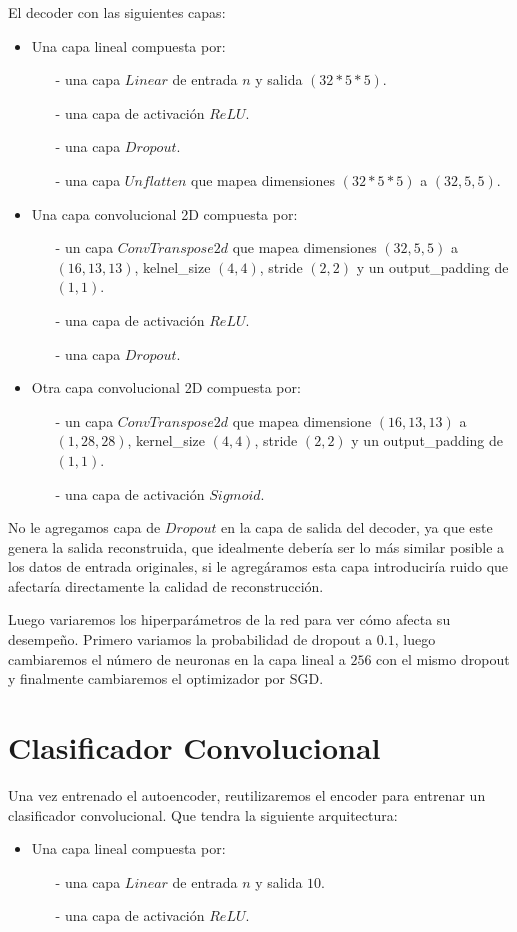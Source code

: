 \documentclass[aps,prl,reprint,groupedaddress]{revtex4-2}
\begin{document}
El decoder con las siguientes capas:
\begin{itemize}
  \item Una capa lineal compuesta por:
  \begin{itemize}
    \item [-] una capa $Linear$ de entrada $n$ y salida $(32*5*5)$.
    \item [-] una capa de activación $ReLU$.
    \item [-] una capa $Dropout$.
    \item [-] una capa $Unflatten$ que mapea dimensiones $(32*5*5)$ a $(32, 5, 5)$.
  \end{itemize}
  \item Una capa convolucional 2D compuesta por:
  \begin{itemize}
    \item [-] un capa $ConvTranspose2d$ que mapea dimensiones $(32, 5, 5)$ a
    $(16, 13, 13)$, kelnel\_size $(4,4)$, stride $(2,2)$ y un 
    output\_padding de $(1,1)$.
    \item [-] una capa de activación $ReLU$.
    \item [-] una capa $Dropout$.
  \end{itemize}
  \item Otra capa convolucional 2D compuesta por:
  \begin{itemize}
    \item [-] un capa $ConvTranspose2d$ que mapea dimensione $(16, 13, 13)$ a
    $(1, 28, 28)$, kernel\_size $(4,4)$, stride $(2,2)$ y un 
    output\_padding de $(1,1)$.
    \item [-] una capa de activación $Sigmoid$.
  \end{itemize}
\end{itemize}

No le agregamos capa de $Dropout$ en la capa de salida del decoder, ya que 
este genera la salida reconstruida, que idealmente debería ser lo más similar 
posible a los datos de entrada originales, si le agregáramos esta capa 
introduciría ruido que afectaría directamente la calidad de reconstrucción.

Luego variaremos los hiperparámetros de la red para ver cómo afecta su 
desempeño. Primero variamos la probabilidad de dropout a $0.1$, luego
cambiaremos el número de neuronas en la capa lineal a $256$ con el mismo 
dropout y finalmente cambiaremos el optimizador por SGD.

\section{Clasificador Convolucional}
Una vez entrenado el autoencoder, reutilizaremos el encoder para entrenar un 
clasificador convolucional. Que tendra la siguiente arquitectura:
\begin{itemize}
  \item Una capa lineal compuesta por:
  \begin{itemize}
    \item [-] una capa $Linear$ de entrada $n$ y salida $10$.
    \item [-] una capa de activación $ReLU$.
  \end{itemize}
\end{itemize}
\end{document}
